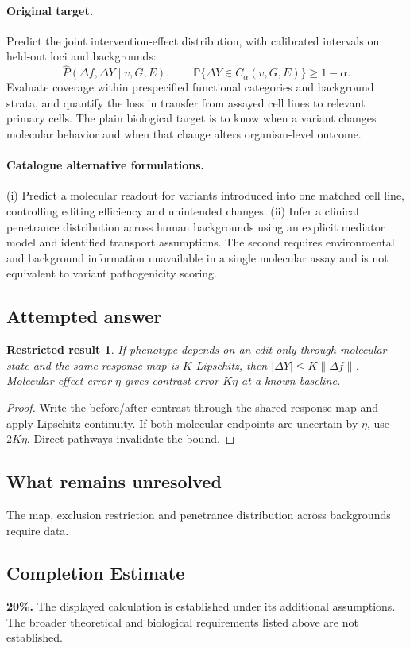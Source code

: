 \documentclass[11pt]{article}
\newcommand{\Prob}{\mathbb P}
\providecommand{\Prob}{\mathbb P}
\newtheorem{attemptresult}{Restricted result}[section]
\begin{document}
\paragraph{Original target.}
Predict the joint intervention-effect distribution, with calibrated intervals on held-out loci and backgrounds:
\[\widehat P(\Delta f,\Delta Y\mid v,G,E),\qquad \Prob\{\Delta Y\in C_\alpha(v,G,E)\}\ge1-\alpha.\]
Evaluate coverage within prespecified functional categories and background strata, and quantify the loss in transfer from assayed cell lines to relevant primary cells. The plain biological target is to know when a variant changes molecular behavior and when that change alters organism-level outcome.
\paragraph{Catalogue alternative formulations.}
(i) Predict a molecular readout for variants introduced into one matched cell line, controlling editing efficiency and unintended changes. (ii) Infer a clinical penetrance distribution across human backgrounds using an explicit mediator model and identified transport assumptions. The second requires environmental and background information unavailable in a single molecular assay and is not equivalent to variant pathogenicity scoring.
\subsection{Attempted answer}
\begin{attemptresult}
If phenotype depends on an edit only through molecular state and the same response map is $K$-Lipschitz, then $|\Delta Y|\leq K\|\Delta f\|$. Molecular effect error $\eta$ gives contrast error $K\eta$ at a known baseline.
\end{attemptresult}
\begin{proof}
Write the before/after contrast through the shared response map and apply Lipschitz continuity. If both molecular endpoints are uncertain by $\eta$, use $2K\eta$. Direct pathways invalidate the bound.
\end{proof}
\subsection{What remains unresolved}
The map, exclusion restriction and penetrance distribution across backgrounds require data.
\subsection{Completion Estimate}
\textbf{20\%.} The displayed calculation is established under its additional assumptions. The broader theoretical and biological requirements listed above are not established.
\end{document}
